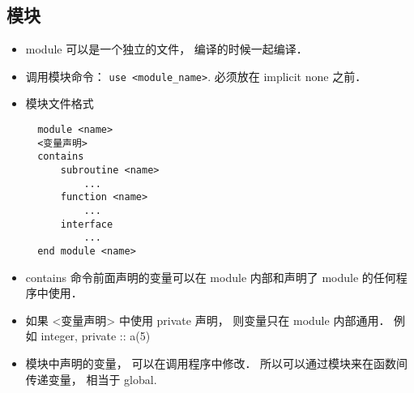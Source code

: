 \subsection{模块}

\begin{itemize}
\item module 可以是一个独立的文件， 编译的时候一起编译．
\item 调用模块命令：  \verb|use <module_name>|.  必须放在 implicit none 之前．
\item 模块文件格式
\begin{lstlisting}
  module <name>
  <变量声明>
  contains
      subroutine <name>
          ...
      function <name>
          ...
      interface
          ...
  end module <name>
\end{lstlisting}
\item contains 命令前面声明的变量可以在 module 内部和声明了 module 的任何程序中使用．
\item 如果 <变量声明> 中使用 private 声明， 则变量只在 module 内部通用． 例如
   integer, private :: a(5)
\item 模块中声明的变量， 可以在调用程序中修改． 所以可以通过模块来在函数间传递变量， 相当于 global.
\end{itemize}
